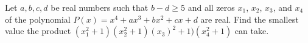 Let $a,b,c,d$ be real numbers such that $b-d\geq5$ and all zeros $x_1$, $x_2$, $x_3$, and $x_4$ of the polynomial $P(x)=x^4+ax^3+bx^2+cx+d$ are real. Find the smallest value the product $(x_1^2+1)(x_2^2+1)(x_3)^2+1)(x_4^2+1)$ can take.

